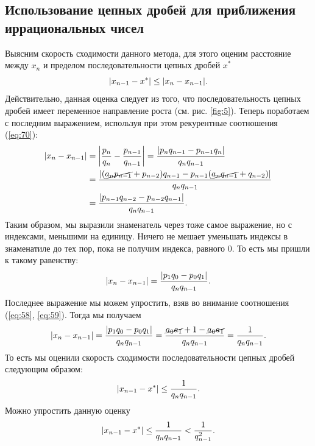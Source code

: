 \documentclass[12pt]{article}
\begin{document}
\subsection{Использование цепных дробей для приближения иррациональных чисел}
Выясним скорость сходимости данного метода, для этого оценим расстояние между $x_n$ и пределом последовательности цепных дробей $x^*$
\begin{equation}
    \abs{x_{n-1} - x^*} \le \abs{x_n - x_{n-1}}.
\end{equation}
Действительно, данная оценка следует из того, что последовательность цепных дробей имеет переменное направление роста (см. рис. \ref{fig:5}). Теперь поработаем с последним выражением, используя при этом рекурентные соотношения (\ref{eq:70}):
\begin{equation}
    \begin{split}
        \abs{x_n - x_{n-1}} &= \abs{\dfrac{p_n}{q_n}-\dfrac{p_{n-1}}{q_{n-1}}} = \dfrac{\abs{p_n q_{n-1} - p_{n-1} q_n}}{q_n q_{n-1}}\\
        &= \dfrac{\abs{\qty(\cancel{a_n p_{n-1}} + p_{n-2})q_{n-1}-p_{n-1}\qty(\cancel{a_n q_{n-1}} + q_{n-2})}}{q_n q_{n-1}}\\
        &=\dfrac{\abs{p_{n-1} q_{n-2} - p_{n-2} q_{n-1}}}{q_n q_{n-1}}.
    \end{split}
\end{equation}
Таким образом, мы выразили знаменатель через тоже самое выражение, но с индексами, меньшими на единицу. Ничего не мешает уменьшать индексы в знаменатиле до тех пор, пока не получим индекса, равного $0$. То есть мы пришли к такому равенству:
\begin{equation}
    \abs{x_n - x_{n-1}} = \dfrac{\abs{p_1 q_{0} - p_{0} q_1}}{q_n q_{n-1}}.
\end{equation}
Последнее выражение мы можем упростить, взяв во внимание соотношения (\ref{eq:58}, \ref{eq:59}). Тогда мы получаем
\begin{equation}
    \abs{x_n - x_{n-1}} = \dfrac{\abs{p_1 q_{0} - p_{0} q_1}}{q_n q_{n-1}} = \dfrac{\cancel{a_0 a_1}+ 1 - \cancel{a_0 a_1}}{q_n q_{n-1}} = \dfrac{1}{q_n q_{n-1}}.
\end{equation}
То есть мы оценили скорость сходимости последовательности цепных дробей следующим образом:
\begin{equation}
    \abs{x_{n-1} - x^*} \le \dfrac{1}{q_n q_{n-1}}.
\end{equation}
Можно упростить данную оценку
\begin{equation}
    \abs{x_{n-1} - x^*} \le \dfrac{1}{q_n q_{n-1}} < \dfrac{1}{q_{n-1}^2}.
\end{equation}
\end{document}
